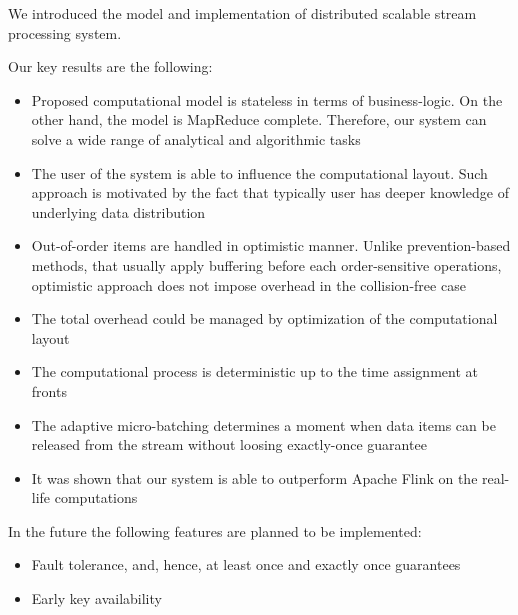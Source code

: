 
\label {fs-conclusions}

We introduced the model and implementation of distributed scalable stream processing system. 

Our key results are the following:

\begin{itemize}
    \item Proposed computational model is stateless in terms of business-logic. On the other hand, the model is MapReduce complete. Therefore, our system can solve a wide range of analytical and algorithmic tasks
    \item The user of the system is able to influence the computational layout. Such approach is motivated by the fact that typically user has deeper knowledge of underlying data distribution
    \item Out-of-order items are handled in optimistic manner. Unlike prevention-based methods, that usually apply buffering before each order-sensitive operations, optimistic approach does not impose overhead in the collision-free case
    \item The total overhead could be managed by optimization of the computational layout
    \item The computational process is deterministic up to the time assignment at fronts
    \item The adaptive micro-batching determines a moment when data items can be released from the stream without loosing exactly-once guarantee  
    \item It was shown that our system is able to outperform Apache Flink on the real-life computations
\end{itemize}

In the future the following features are planned to be implemented:
\begin{itemize}
    \item Fault tolerance, and, hence, at least once and exactly once guarantees
    \item Early key availability
\end{itemize}

